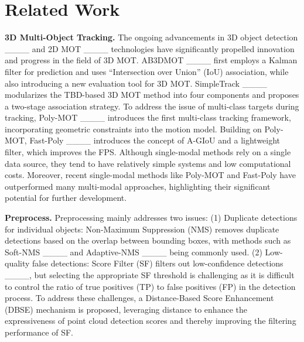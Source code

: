 \section{Related Work}
\textbf{3D Multi-Object Tracking.} The ongoing advancements in 3D object detection ____ and 2D MOT ____ technologies have significantly propelled innovation and progress in the field of 3D MOT. AB3DMOT ____ first employs a Kalman filter for prediction and uses “Intersection over Union” (IoU) association, while also introducing a new evaluation tool for 3D MOT. SimpleTrack ____ modularizes the TBD-based 3D MOT method into four components and proposes a two-stage association strategy. To address the issue of multi-class targets during tracking, Poly-MOT ____ introduces the first multi-class tracking framework, incorporating geometric constraints into the motion model. Building on Poly-MOT, Fast-Poly ____ introduces the concept of A-GIoU and a lightweight filter, which improves the FPS. Although single-modal methods rely on a single data source, they tend to have relatively simple systems and low computational costs. Moreover, recent single-modal methods like Poly-MOT and Fast-Poly have outperformed many multi-modal approaches, highlighting their significant potential for further development.

\textbf{Preprocess.} Preprocessing mainly addresses two issues: (1) Duplicate detections for individual objects: Non-Maximum Suppression (NMS) removes duplicate detections based on the overlap between bounding boxes, with methods such as  Soft-NMS ____ and Adaptive-NMS ____ being commonly used. (2) Low-quality false detections: Score Filter (SF) filters out low-confidence detections ____, but selecting the appropriate SF threshold is challenging as it is difficult to control the ratio of true positives (TP) to false positives (FP) in the detection process. To address these challenges, a Distance-Based Score Enhancement (DBSE) mechanism is proposed, leveraging distance to enhance the expressiveness of point cloud detection scores and thereby improving the filtering performance of SF.

